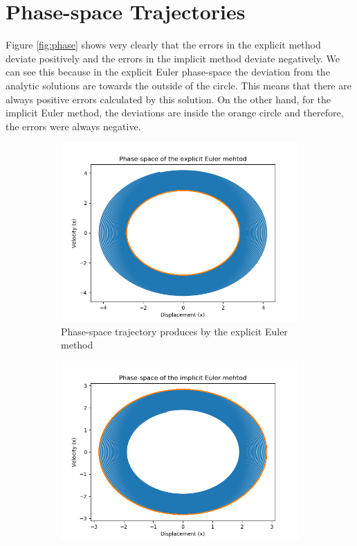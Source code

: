 \documentclass{article}
\begin{document}
\section{Phase-space Trajectories}
Figure \ref{fig:phase} shows very clearly that the errors in the explicit method deviate positively and the errors in the implicit method deviate negatively. We can see this because in the explicit Euler phase-space the deviation from the analytic solutions are towards the outside of the circle. This means that there are always positive errors calculated by this solution. On the other hand, for the implicit Euler method, the deviations are inside the orange circle and therefore, the errors were always negative.  
\begin{figure}[h]
    \centering
    \begin{subfigure}{0.7\textwidth}
    \includegraphics[width =\textwidth]{Images/phaseexp.png}
    \caption{Phase-space trajectory produces by the explicit Euler method}
    \end{subfigure}
    \begin{subfigure}{0.7\textwidth}
    \includegraphics[width =\textwidth]{Images/phaseimp.png}

\end{subfigure}
\end{figure}
\end{document}
